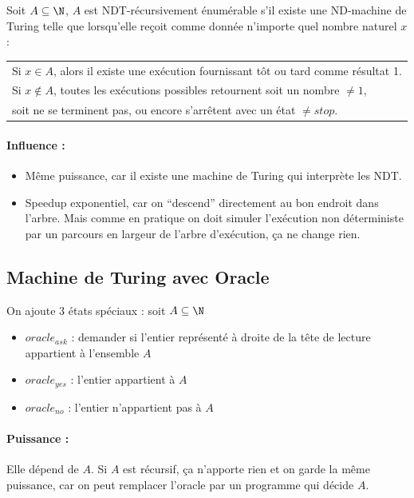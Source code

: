 \begin{mydef} Soit $A\subseteq \N$, $A$ est
	NDT-récursivement énumérable s'il
	existe une ND-machine de Turing telle que lorsqu'elle reçoit comme
	donnée n'importe quel nombre naturel $x$:\\
	\begin{tabular}{l}
		Si $x\in A$, alors il existe une exécution fournissant tôt ou
		tard comme résultat 1.\\
		Si $x\notin A$, toutes les exécutions possibles retournent soit un
		nombre $\neq 1$, \\
		soit ne se terminent pas, ou encore s'arrêtent avec
		un état $\neq stop$.\\
	\end{tabular}
\end{mydef}

\paragraph{Influence :}
\begin{itemize}
	\item Même puissance, car il existe une machine de Turing qui interprète
	 les NDT.
	\item Speedup exponentiel, car on ``descend'' directement au bon endroit
		dans l'arbre. Mais comme en pratique on doit simuler
		l'exécution non déterministe par un parcours en largeur de l'arbre d'exécution,
		 ça ne change rien.
\end{itemize}

\subsection{Machine de Turing avec Oracle}
On ajoute 3 états spéciaux : soit $A \subseteq \N$
\begin{itemize}
	\item $oracle_{ask}$ : demander si l'entier représenté à droite de la
		tête de lecture appartient à l'ensemble $A$
	\item $oracle_{yes}$ : l'entier appartient à $A$
	\item $oracle_{no}$ :  l'entier n'appartient pas à $A$
\end{itemize}

\paragraph{Puissance :} Elle dépend de $A$. Si $A$ est récursif, ça n'apporte rien et
  on garde la même puissance, car on peut remplacer l'oracle par un programme qui décide
  $A$.

